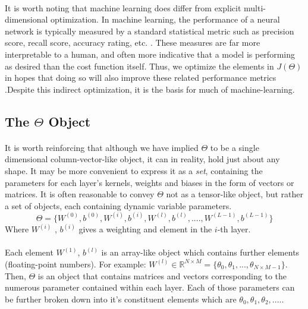 \documentclass[12pt,letterpaper]{article}
\begin{document}
\paragraph*{}It is worth noting that machine learning does differ from explicit multi-dimensional optimization. In machine learning, the performance of a neural network is typically measured by a standard statistical metric such as precision score, recall score, accuracy rating, etc. \cite{Geron}. These measures are far more interpretable to a human, and often more indicative that a model is performing as desired than the cost function itself. Thus, we optimize the elements in $J(\Theta)$ in hopes that doing so will also improve these related performance metrics \cite{Goodfellow}.Despite this indirect optimization, it is the basis for much of machine-learning.


\subsection{The $\Theta$ Object}

\paragraph*{}It is worth reinforcing that although we have implied $\Theta$ to be a single dimensional column-vector-like object, it can in reality, hold just about any shape. It may be more convenient to express it as a \textit{set}, containing the parameters for each layer's kernels, weights and biases in the form of vectors or matrices. It is often reasonable to convey $\Theta$ not as a tensor-like object, but rather a set of objects, each containing dynamic variable parameters. 
\begin{equation}
\label{THETA}
\Theta = \big\{ W^{(0)} , b^{(0)} , W^{(i)} , b^{(i)}, W^{(l)} , b^{(l)}, ....,
W^{(L-1)} , b^{(L-1)} \big\} 
\end{equation}
Where $W^{(i)}$ , $b^{(i)}$ gives a weighting and element in the $i$-th layer. 

\paragraph*{}Each element  $W^{(1)}$, $b^{(l)}$ is an array-like object which contains further elements (floating-point numbers). For example: 
$W^{(l)} \in \mathbb{R}^{N \times M} = \big\{ \theta_0 , \theta_1 , ... , \theta_{N \times M - 1} \big\}$. Then, $\Theta$ is an object that contains matrices and vectors corresponding to the numerous parameter contained within each layer. Each of those parameters can be further broken down into it's constituent elements which are $\theta_0 , \theta_1 , \theta_2 , .... $. 
\end{document}

